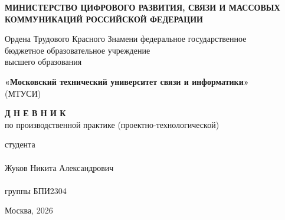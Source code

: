 \documentclass[12pt,a4paper]{report}
\begin{document}
\begin{titlepage}
\begin{center}

\textbf{МИНИСТЕРСТВО ЦИФРОВОГО РАЗВИТИЯ, СВЯЗИ И МАССОВЫХ КОММУНИКАЦИЙ РОССИЙСКОЙ ФЕДЕРАЦИИ}

\vspace{0.3em}

\parbox{0.9\textwidth}{\centering\small
Ордена Трудового Красного Знамени федеральное государственное \\
бюджетное образовательное учреждение \\
высшего образования
}

\vspace{0.3em}

\textbf{«Московский технический университет связи и информатики»} \\
(МТУСИ)

\vfill

\textbf{\Large Д Н Е В Н И К} \\
по производственной практике (проектно-технологической)

\vfill

\begin{flushright}
\begin{minipage}{0.55\textwidth}
\raggedleft

студента \hrulefill \\
\makebox[\linewidth]{\hrulefill} \\
Жуков Никита Александрович \hrulefill \\
\makebox[\linewidth]{\hrulefill} \\
группы БПИ2304 \hrulefill \\
\makebox[\linewidth]{\hrulefill}
\end{minipage}
\end{flushright}

\vfill

\begin{center}
Москва, 2026
\end{center}

\end{center}
\end{titlepage}

\newpage
\thispagestyle{empty}
\end{document}
